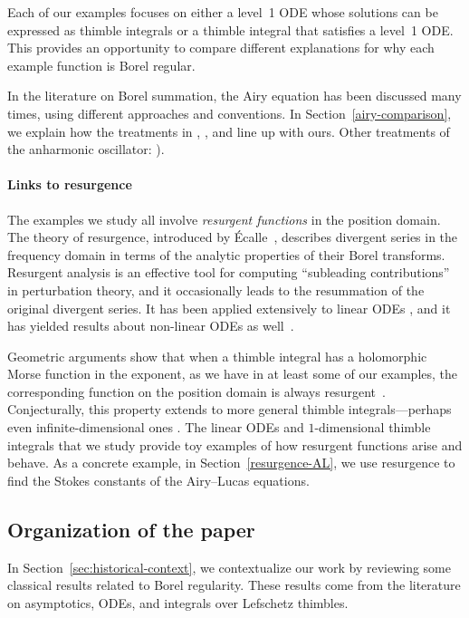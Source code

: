 \documentclass{article}
\theoremstyle{definition}
\theoremstyle{plain}
\newenvironment{todo}{\color{Coral}}{\color{black}}
\begin{document}
Each of our examples focuses on either a level~1 ODE whose solutions can be expressed as thimble integrals or a thimble integral that satisfies a level~1 ODE. This provides an opportunity to compare different explanations for why each example function is Borel regular.

In the literature on Borel summation, the Airy equation has been discussed many times, using different approaches and conventions. In Section~\ref{airy-comparison}, we explain how the treatments in \cite[Section 2.2]{lectures-Marino}, \cite[Section 6.14]{diverg-resurg-i}, and \cite[Section 2.2]{kawai-takei} line up with ours.
 \begin{todo}Other treatments of the anharmonic oscillator: \cite{bender-wu}\cite[Appendix B]{aniceto2019primer}\cite[Section 2.5.3]{sternin1995borel}).\end{todo}
%
\paragraph{Links to resurgence}
%
The examples we study all involve {\em resurgent functions} in the position domain. The theory of resurgence, introduced by \'Ecalle~\cite{EcalleI,EcalleII,EcalleIII}, describes divergent series in the frequency domain in terms of the analytic properties of their Borel transforms. Resurgent analysis is an effective tool for computing ``subleading contributions'' in perturbation theory, and it occasionally leads to the resummation of the original divergent series. It has been applied extensively to linear ODEs \cite{loday1994stokes,diverg-resurg--ii}, and it has yielded results about non-linear ODEs as well~\cite{costin-PI,costin_kruskal,diverg-resurg-iii,schiappa-PI}.

Geometric arguments show that when a thimble integral has a holomorphic Morse function in the exponent, as we have in at least some of our examples, the corresponding function on the position domain is always resurgent~\cite{Maxim_slide_ERC}\cite[Section 6.2]{kontsevich2022analyticity}. Conjecturally, this property extends to more general thimble integrals---perhaps even infinite-dimensional ones \cite[examples~5--6]{Maxim_slide_ERC}. The linear ODEs and $1$-dimensional thimble integrals that we study provide toy examples of how resurgent functions arise and behave. As a concrete example, in Section~\ref{resurgence-AL}, we use resurgence to find the Stokes constants of the Airy--Lucas equations.
%
\subsection{Organization of the paper}\label{sec:org}
%
In Section~\ref{sec:historical-context}, we contextualize our work by reviewing some classical results related to Borel regularity. These results come from the literature on asymptotics, ODEs, and integrals over Lefschetz thimbles.
\end{document}
